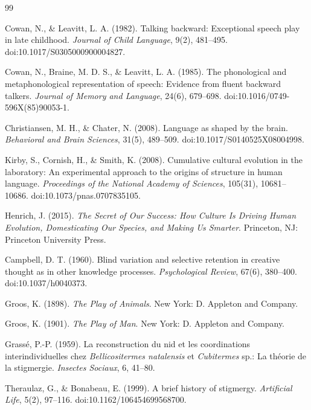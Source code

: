 \documentclass[11pt]{article}
\begin{document}
\begin{thebibliography}{99}

 Cowan, N., \& Leavitt, L. A. (1982). Talking backward: Exceptional speech play in late childhood. \emph{Journal of Child Language}, 9(2), 481--495. doi:10.1017/S0305000900004827.

 Cowan, N., Braine, M. D. S., \& Leavitt, L. A. (1985). The phonological and metaphonological representation of speech: Evidence from fluent backward talkers. \emph{Journal of Memory and Language}, 24(6), 679--698. doi:10.1016/0749-596X(85)90053-1.


 Christiansen, M. H., \& Chater, N. (2008). Language as shaped by the brain. \emph{Behavioral and Brain Sciences}, 31(5), 489--509. doi:10.1017/S0140525X08004998.

 Kirby, S., Cornish, H., \& Smith, K. (2008). Cumulative cultural evolution in the laboratory: An experimental approach to the origins of structure in human language. \emph{Proceedings of the National Academy of Sciences}, 105(31), 10681--10686. doi:10.1073/pnas.0707835105.

 Henrich, J. (2015). \emph{The Secret of Our Success: How Culture Is Driving Human Evolution, Domesticating Our Species, and Making Us Smarter}. Princeton, NJ: Princeton University Press.


 Campbell, D. T. (1960). Blind variation and selective retention in creative thought as in other knowledge processes. \emph{Psychological Review}, 67(6), 380--400. doi:10.1037/h0040373.

 Groos, K. (1898). \emph{The Play of Animals}. New York: D. Appleton and Company.

 Groos, K. (1901). \emph{The Play of Man}. New York: D. Appleton and Company.


 Grass\'e, P.-P. (1959). La reconstruction du nid et les coordinations interindividuelles chez \emph{Bellicositermes natalensis} et \emph{Cubitermes} sp.: La th\'eorie de la stigmergie. \emph{Insectes Sociaux}, 6, 41--80.

 Theraulaz, G., \& Bonabeau, E. (1999). A brief history of stigmergy. \emph{Artificial Life}, 5(2), 97--116. doi:10.1162/106454699568700.


\end{thebibliography}
\end{document}
